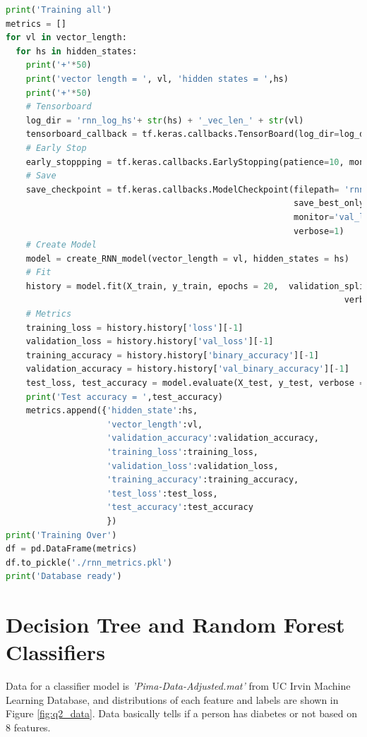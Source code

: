 \documentclass[11pt]{article}
\begin{document}
\begin{lstlisting}[language=Python, basicstyle=\tiny, caption=Python code for the fine-tuned LSTM model]
print('Training all')
metrics = []
for vl in vector_length:
  for hs in hidden_states:
    print('+'*50)
    print('vector length = ', vl, 'hidden states = ',hs)
    print('+'*50)
    # Tensorboard
    log_dir = 'rnn_log_hs'+ str(hs) + '_vec_len_' + str(vl)
    tensorboard_callback = tf.keras.callbacks.TensorBoard(log_dir=log_dir, update_freq='epoch', profile_batch = 0)
    # Early Stop
    early_stoppping = tf.keras.callbacks.EarlyStopping(patience=10, monitor='val_loss', verbose=1)
    # Save
    save_checkpoint = tf.keras.callbacks.ModelCheckpoint(filepath= 'rnn_log_hs'+ str(hs) + '_vec_len_' + str(vl) + '.h5',
                                                         save_best_only=True,
                                                         monitor='val_loss',
                                                         verbose=1)
    # Create Model
    model = create_RNN_model(vector_length = vl, hidden_states = hs)
    # Fit
    history = model.fit(X_train, y_train, epochs = 20,  validation_split = 0.2, use_multiprocessing = True,
                                                                   verbose = 1, callbacks = [tensorboard_callback, early_stoppping, save_checkpoint])
    # Metrics
    training_loss = history.history['loss'][-1]
    validation_loss = history.history['val_loss'][-1]
    training_accuracy = history.history['binary_accuracy'][-1]
    validation_accuracy = history.history['val_binary_accuracy'][-1]
    test_loss, test_accuracy = model.evaluate(X_test, y_test, verbose = 2)
    print('Test accuracy = ',test_accuracy)
    metrics.append({'hidden_state':hs,
                    'vector_length':vl,
                    'validation_accuracy':validation_accuracy,
                    'training_loss':training_loss,
                    'validation_loss':validation_loss,
                    'training_accuracy':training_accuracy,
                    'test_loss':test_loss,
                    'test_accuracy':test_accuracy
                    })
print('Training Over')
df = pd.DataFrame(metrics)
df.to_pickle('./rnn_metrics.pkl')
print('Database ready')
\end{lstlisting}

\newpage

\section{Decision Tree and Random Forest Classifiers}

Data for a classifier model is \textit{'Pima-Data-Adjusted.mat'} from UC Irvin Machine Learning Database, and distributions of each feature and labels are shown in Figure \ref{fig:q2_data}. Data basically tells if a person has diabetes or not based on 8 features.
\end{document}
